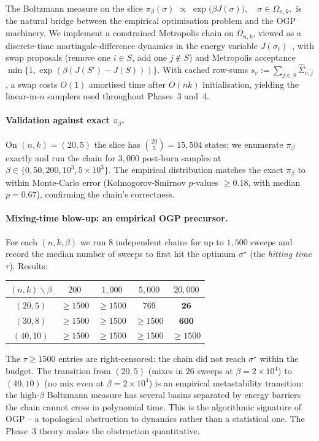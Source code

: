 The Boltzmann measure on the slice
\(
  \pi_\beta(\sigma) \;\propto\; \exp\bigl(\beta J(\sigma)\bigr),\quad \sigma\in\Omega_{n,k},
\)
is the natural bridge between the empirical optimisation problem and the OGP machinery.
We implement a constrained Metropolis chain on $\Omega_{n,k}$, viewed as a
discrete-time martingale-difference dynamics in the energy variable
$J(\sigma_t)$~\cite{vershynin}, with swap proposals (remove one $i\in S$, add one
$j\notin S$) and Metropolis acceptance $\min\{1,\exp(\beta(J(S')-J(S)))\}$. With cached
row-sums $s_v := \sum_{j\in S}\hat\Sigma_{v,j}$, a swap costs $O(1)$ amortised time
after $O(nk)$ initialisation, yielding the linear-in-$n$ samplers used throughout
Phases~3 and~4.

\paragraph{Validation against exact $\pi_\beta$.} On $(n,k)=(20,5)$ the slice has
$\binom{20}{5}=15{,}504$ states; we enumerate $\pi_\beta$ exactly and run the chain for
$3{,}000$ post-burn samples at $\beta\in\{0,50,200,10^3,5\!\times\!10^3\}$. The empirical
distribution matches the exact $\pi_\beta$ to within Monte-Carlo error (Kolmogorov-Smirnov
$p$-values $\ge 0.18$, with median $p=0.67$), confirming the chain's correctness.

\paragraph{Mixing-time blow-up: an empirical OGP precursor.} For each $(n,k,\beta)$ we run
$8$ independent chains for up to $1{,}500$ sweeps and record the median number of sweeps
to first hit the optimum $\sigma^\star$ (the \emph{hitting time} $\tau$). Results:

\begin{center}\small
\begin{tabular}{c|cccc}
$(n,k)\backslash\beta$ & $200$ & $1{,}000$ & $5{,}000$ & $20{,}000$\\\hline
$(20,5)$ & $\geq 1500$ & $\geq 1500$ & $769$ & $\mathbf{26}$\\
$(30,8)$ & $\geq 1500$ & $\geq 1500$ & $\geq 1500$ & $\mathbf{600}$\\
$(40,10)$ & $\geq 1500$ & $\geq 1500$ & $\geq 1500$ & $\geq 1500$\\
\end{tabular}
\end{center}

The $\tau \ge 1500$ entries are right-censored: the chain did not reach $\sigma^\star$
within the budget. The transition from $(20,5)$ (mixes in $26$ sweeps at
$\beta=2\!\times\!10^4$) to $(40,10)$ (no mix even at $\beta=2\!\times\!10^4$) is an
empirical metastability transition: the high-$\beta$ Boltzmann measure has several basins
separated by energy barriers the chain cannot cross in polynomial time. This is the
algorithmic signature of OGP -- a topological obstruction to dynamics rather than a
statistical one. The Phase~3 theory makes the obstruction quantitative.

